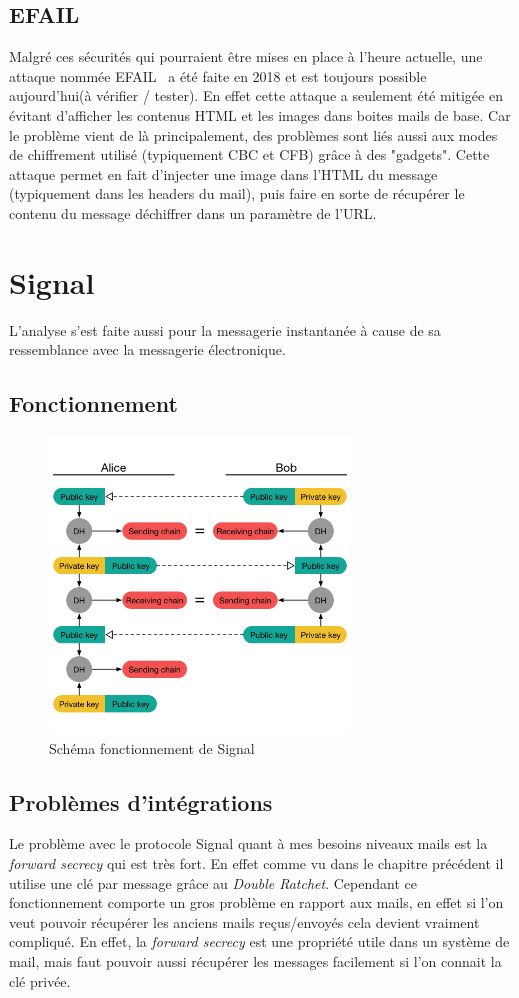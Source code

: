 \subsection{EFAIL}
\label{attacks:EFAIL}
Malgré ces sécurités qui pourraient être mises en place à l’heure actuelle, une attaque nommée EFAIL~\cite{DBLP:conf/uss/PoddebniakD0ISF18} a été faite en 2018 et est toujours possible aujourd’hui(à vérifier / tester). En effet cette attaque a seulement été mitigée en évitant d’afficher les contenus HTML et les images dans boites mails de base. Car le problème vient de là principalement, des problèmes sont liés aussi aux modes de chiffrement utilisé (typiquement CBC et CFB) grâce à des "gadgets".
Cette attaque permet en fait d'injecter une image dans l'HTML du message (typiquement dans les headers du mail), puis faire en sorte de récupérer le contenu du message déchiffrer dans un paramètre de l'URL.
\section{Signal}
L'analyse s'est faite aussi pour la messagerie instantanée à cause de sa ressemblance avec la messagerie électronique. 
\subsection{Fonctionnement}
\begin{figure}[h!]
	\centering
	\includegraphics[width=8cm]{images/signalFonctionnement.png}
	\caption{Schéma fonctionnement de Signal\cite{doubleratchet}}
	\label{fig:signal}
\end{figure}
\subsection{Problèmes d'intégrations}
Le problème avec le protocole Signal quant à mes besoins niveaux mails est la \textit{forward secrecy} qui est très fort. En effet comme vu dans le chapitre précédent il utilise une clé par message grâce au \textit{Double Ratchet}. Cependant ce fonctionnement comporte un gros problème en rapport aux mails, en effet si l'on veut pouvoir récupérer les anciens mails reçus/envoyés cela devient vraiment compliqué. En effet, la \textit{forward secrecy} est une propriété utile dans un système de mail, mais faut pouvoir aussi récupérer les messages facilement si l'on connait la clé privée.
